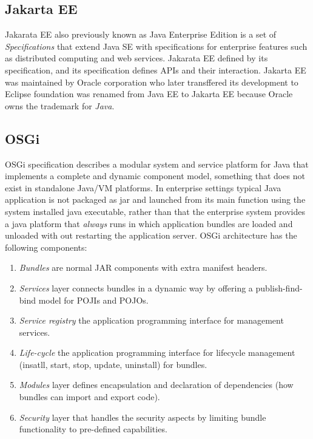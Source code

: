 \documentclass[a4paper]{article}
\begin{document}
\subsection*{Jakarta EE}
Jakarata EE also previously known as Java Enterprise Edition is a set of \emph{Specifications} that extend Java SE
with specifications for enterprise features such as distributed computing and web services. Jakarata EE defined by 
its specification, and its specification defines APIs and their interaction. Jakarta EE was maintained by Oracle
corporation who later transffered its development to Eclipse foundation was renamed from Java EE to Jakarta EE because
Oracle owns the trademark for \emph{Java}. 

\subsection*{OSGi}

OSGi specification describes a modular system and service platform for Java that implements a complete and 
dynamic component model, something that does not exist in standalone Java/VM platforms. In enterprise settings typical 
Java application is not packaged as jar and launched from its main function using the system installed java executable,
rather than that the enterprise system provides a java platform that \emph{always} runs in which application bundles are
loaded and unloaded with out restarting the application server. OSGi architecture has the following components:

\begin{enumerate}
    \item \emph{Bundles} are normal JAR components with extra manifest headers.
    \item \emph{Services} layer connects bundles in a dynamic way by offering a publish-find-bind model for POJIs and POJOs.
    \item \emph{Service registry} the application programming interface for management services.
    \item \emph{Life-cycle} the application programming interface for lifecycle management (insatll, start, stop, update, uninstall)
          for bundles.
    \item \emph{Modules} layer defines encapsulation and declaration of dependencies (how bundles can import and export code).
    \item \emph{Security} layer that handles the security aspects by limiting bundle functionality to pre-defined capabilities.
\end{enumerate}
\end{document}
